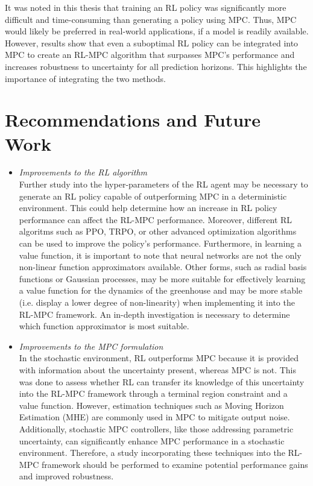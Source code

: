 It was noted in this thesis that training an RL policy was significantly more difficult and time-consuming than generating a policy using MPC. Thus, MPC would likely be preferred in real-world applications, if a model is readily available. However, results show that even a suboptimal RL policy can be integrated into MPC to create an RL-MPC algorithm that surpasses MPC's performance and increases robustness to uncertainty for all prediction horizons. This highlights the importance of integrating the two methods.


\section{Recommendations and Future Work}

\begin{itemize}
	\item \textit{Improvements to the RL algorithm}
	\\Further study into the hyper-parameters of the RL agent may be necessary to generate an RL policy capable of outperforming MPC in a deterministic environment. This could help determine how an increase in RL policy performance can affect the RL-MPC performance.  Moreover, different RL algoritms such as PPO, TRPO, or other advanced optimization algorithms  can be used to improve the policy's performance. Furthermore, in learning a value function, it is important to note that neural networks are not the only non-linear function approximators available. Other forms, such as radial basis functions or Gaussian processes, may be more suitable for effectively learning a value function for the dynamics of the greenhouse and may be more stable (i.e. display a lower degree of non-linearity) when implementing it into the RL-MPC framework. An in-depth investigation is necessary to determine which function approximator is most suitable.
	
	\item \textit{Improvements to the MPC formulation}
	\\In the stochastic environment, RL outperforms MPC because it is provided with information about the uncertainty present, whereas MPC is not. This was done to assess whether RL can transfer its knowledge of this uncertainty into the RL-MPC framework through a terminal region constraint and a value function. However, estimation techniques such as Moving Horizon Estimation (MHE) are commonly used in MPC to mitigate output noise. Additionally, stochastic MPC controllers, like those addressing parametric uncertainty, can significantly enhance MPC performance in a stochastic environment. Therefore, a study incorporating these techniques into the RL-MPC framework should be performed to examine potential performance gains and improved robustness.
	

\end{itemize}

